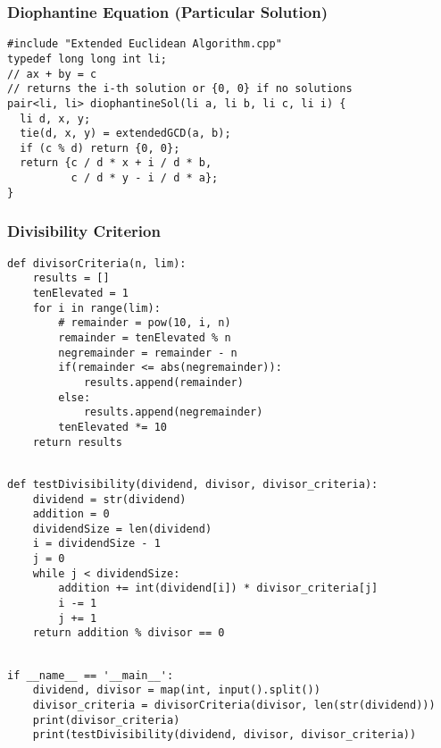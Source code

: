 \documentclass[twoside]{article}
\newcommand{\fileTitleStyle}{\large\underline}
\begin{document}
\begin{multicols*}{2}
\subsubsection*{Diophantine Equation (Particular Solution)}
\begin{verbatim}
#include "Extended Euclidean Algorithm.cpp"
typedef long long int li;
// ax + by = c
// returns the i-th solution or {0, 0} if no solutions
pair<li, li> diophantineSol(li a, li b, li c, li i) {
  li d, x, y;
  tie(d, x, y) = extendedGCD(a, b);
  if (c % d) return {0, 0};
  return {c / d * x + i / d * b,
          c / d * y - i / d * a};
}
\end{verbatim}

\subsubsectionfont{\centering\bfseries\Large}
\subsubsectionfont{\fileTitleStyle}
\subsubsection*{Divisibility Criterion}
\begin{verbatim}
def divisorCriteria(n, lim):
    results = []
    tenElevated = 1
    for i in range(lim):
        # remainder = pow(10, i, n)
        remainder = tenElevated % n
        negremainder = remainder - n
        if(remainder <= abs(negremainder)):
            results.append(remainder)
        else:
            results.append(negremainder)
        tenElevated *= 10
    return results


\end{verbatim}
\vspace{-12pt}
\begin{verbatim}
def testDivisibility(dividend, divisor, divisor_criteria):
    dividend = str(dividend)
    addition = 0
    dividendSize = len(dividend)
    i = dividendSize - 1
    j = 0
    while j < dividendSize:
        addition += int(dividend[i]) * divisor_criteria[j]
        i -= 1
        j += 1
    return addition % divisor == 0


\end{verbatim}
\vspace{-12pt}
\begin{verbatim}
if __name__ == '__main__':
    dividend, divisor = map(int, input().split())
    divisor_criteria = divisorCriteria(divisor, len(str(dividend)))
    print(divisor_criteria)
    print(testDivisibility(dividend, divisor, divisor_criteria))


\end{verbatim}
\end{multicols*}
\end{document}
